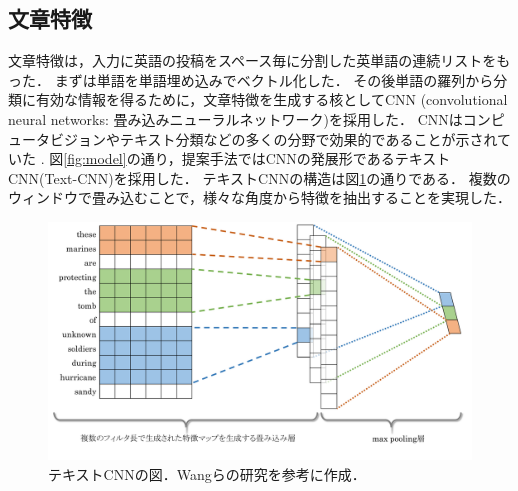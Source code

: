 \subsection{文章特徴} \label{subsec:text}
文章特徴は，入力に英語の投稿をスペース毎に分割した英単語の連続リストをもった．
まずは単語を単語埋め込みでベクトル化した．
その後単語の羅列から分類に有効な情報を得るために，文章特徴を生成する核としてCNN
(convolutional neural networks: 畳み込みニューラルネットワーク)を採用した．
CNNはコンピュータビジョンやテキスト分類などの多くの分野で効果的であることが示されていた
\cite{collobert2011natural,KalchbrennerACL2014}.
図\ref{fig:model}の通り，提案手法ではCNNの発展形であるテキストCNN(Text-CNN)\cite{DBLP:journals/corr/Kim14f}を採用した．
テキストCNNの構造は図\ref{fig:text-cnn}の通りである．
複数のウィンドウで畳み込むことで，様々な角度から特徴を抽出することを実現した．
\begin{figure}[H]
    \centering
    \includegraphics[width=\linewidth]{images/text-cnn.pdf}
    \caption{テキストCNNの図．Wangらの研究\cite{Wang:2018:EEA:3219819.3219903}を参考に作成．}
    \label{fig:text-cnn}
\end{figure}

